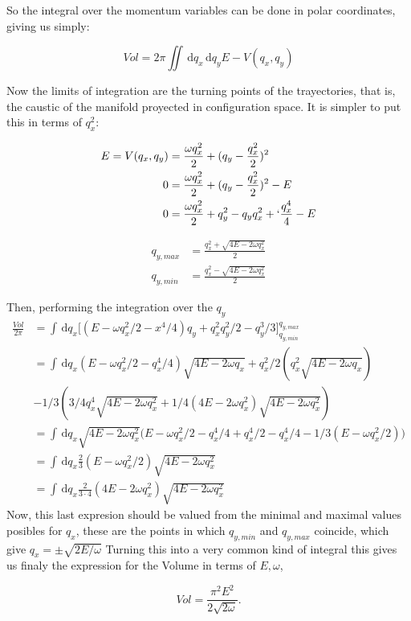 \documentclass[a4paper,12pt]{article}
\newcommand{\dif}{\, \mathrm{d}}
\begin{document}
So the integral over the momentum variables can be done
in polar coordinates, giving us simply:

\begin{equation} 
Vol= 2 \pi \iint \dif q_x \dif q_y E-V(q_x, q_y)
\end{equation}

Now the limits of integration are the turning points of the
trayectories, that is, the caustic of the manifold proyected
in configuration space. It is simpler to put this in
terms of $q_x^2$:

\begin{align}
E=V(q_x, q_y) & =  \frac{\omega q_x^2}{2}+(q_y - \frac{q_x^2}{2})^2 \\
0 &=  \frac{\omega q_x^2}{2}+(q_y - \frac{q_x^2}{2})^2  -E \\
0 &=  \frac{\omega q_x^2}{2}+ q_y^2 - q_yq_x^2 +`\frac{q_x^4}{4} -E
\end{align}

\begin{align}
q_{y,max} &= \frac{q_x^2 + \sqrt{4E-2\omega q_x^2}}{2} \\
q_{y,min} &=\frac{q_x^2 - \sqrt{4E-2\omega q_x^2}}{2}
\end{align}

Then, performing the integration over the $q_y$
\begin{align}
\frac{Vol}{2\pi} & = \int \dif q_x \bigr[
(E  - \omega q_x^2/2 -x^4/4) q_y + q_x^2 q_y^2/2-q_y^3/3  
\bigl]_{q_{y,min}}^  {q_{y,max}}\\
& = \int \dif q_x
(E  - \omega q_x^2/2 -q_x^4/4) \sqrt{4E-2\omega q_x} 
+q_x^2/2 (q_x^2  \sqrt{4E-2\omega q_x} ) \\
&-  1/3 ( 3/4 q_x^4 \sqrt{4E-2 \omega q_x^2} 
+ 1/4(4E-2 \omega q_x^2)\sqrt{4E-2 \omega q_x^2} ) \\
& = \int \dif q_x 
\sqrt{4E-2 \omega q_x^2} \bigl(
E-\omega q_x^2/2 -q_x^4/4 +q_x^4/2 - q_x^4 /4 -1/3(E- \omega q_x^2/2) \bigr) \\
& = \int \dif q_x \frac{2}{3}(E- \omega q_x^2/2)\sqrt{4E-2 \omega q_x^2}  \\
& = \int \dif q_x \frac{2}{3\cdot4}(4E- 2\omega q_x^2)\sqrt{4E-2 \omega q_x^2}
\end{align}
Now, this last expresion should be valued from the minimal and maximal
values posibles for $q_x$, these are the points in which 
$q_{y,min}$ and $q_{y,max}$ coincide, which give $q_x=\pm \sqrt{ 2 E /\omega}$ 
Turning this into a very common kind of integral this gives us finaly the
expression for the Volume in terms of $E, \omega$,

\begin{equation}
Vol=\frac{\pi^2 E^2}{ 2 \sqrt{2 \omega}}. 
\end{equation}
\end{document}
